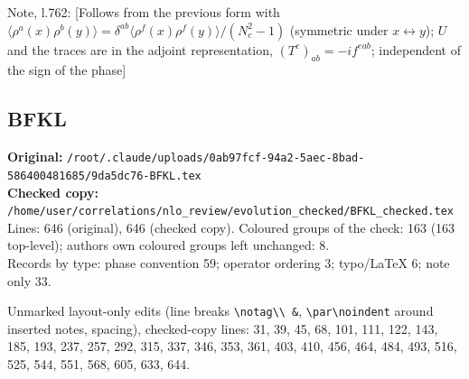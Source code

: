 \documentclass[10pt]{article}
\newenvironment{notebox}{\def\FrameCommand{{\color{notebar}\vrule width 1.5pt}\hspace{6pt}}\MakeFramed{\advance\hsize-\width\FrameRestore}\small}{\endMakeFramed}
\begin{document}
\begin{notebox}\textsf{\small Note, l.762:} [Follows from the previous form with $\langle\rho^{a}(x)\rho^{b}(y)\rangle=\delta^{ab}\langle\rho^{f}(x)\rho^{f}(y)\rangle/(N_c^{2}-1)$ (symmetric under $x\leftrightarrow y$); $U$ and the traces are in the adjoint representation, $(T^{e})_{ab}=-if^{eab}$; independent of the sign of the phase]\end{notebox}
\bigskip
\subsection{BFKL}\label{sec:file-bfkl}
\noindent\textbf{Original:} \texttt{/root/.claude/uploads/0ab97fcf-94a2-5aec-8bad-586400481685/9da5dc76-BFKL.tex}\\\textbf{Checked copy:} \texttt{/home/user/correlations/nlo\_review/evolution\_checked/BFKL\_checked.tex}\\
Lines: 646 (original), 646 (checked copy). Coloured groups of the check: 163 (163 top-level); author\textquotesingle s own coloured groups left unchanged: 8.\\
Records by type: phase convention 59; operator ordering 3; typo/LaTeX 6; note only 33.
\par\noindent Unmarked layout-only edits (line breaks \texttt{\textbackslash notag\textbackslash\textbackslash\ \&}, \texttt{\textbackslash par\textbackslash noindent} around inserted notes, spacing), checked-copy lines: 31, 39, 45, 68, 101, 111, 122, 143, 185, 193, 237, 257, 292, 315, 337, 346, 353, 361, 403, 410, 456, 464, 484, 493, 516, 525, 544, 551, 568, 605, 633, 644.
\end{document}
